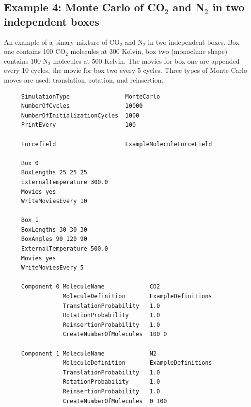 \subsection*{Example 4: Monte Carlo of CO$_2$ and N$_2$ in two independent boxes}
An example of a binary mixture of CO$_2$ and N$_2$ in two independent boxes. Box one contains 100 CO$_2$ molecules
at 300 Kelvin, box two (monoclinic shape) contains 100 N$_2$ molecules at 500 Kelvin. The movies for box one are appended
every 10 cycles, the movie for box two every 5 cycles. Three types of Monte Carlo moves are used: translation, rotation, and
reinsertion. 

\begin{tiny}
\begin{verbatim}
     SimulationType                MonteCarlo
     NumberOfCycles                10000
     NumberOfInitializationCycles  1000
     PrintEvery                    100
     
     Forcefield                    ExampleMoleculeForceField
     
     Box 0
     BoxLengths 25 25 25
     ExternalTemperature 300.0
     Movies yes
     WriteMoviesEvery 10
     
     Box 1
     BoxLengths 30 30 30
     BoxAngles 90 120 90
     ExternalTemperature 500.0
     Movies yes
     WriteMoviesEvery 5
     
     Component 0 MoleculeName             CO2
                 MoleculeDefinition       ExampleDefinitions
                 TranslationProbability   1.0
                 RotationProbability      1.0
                 ReinsertionProbability   1.0
                 CreateNumberOfMolecules  100 0
     
     Component 1 MoleculeName             N2
                 MoleculeDefinition       ExampleDefinitions
                 TranslationProbability   1.0
                 RotationProbability      1.0
                 ReinsertionProbability   1.0
                 CreateNumberOfMolecules  0 100
\end{verbatim}
\end{tiny}


